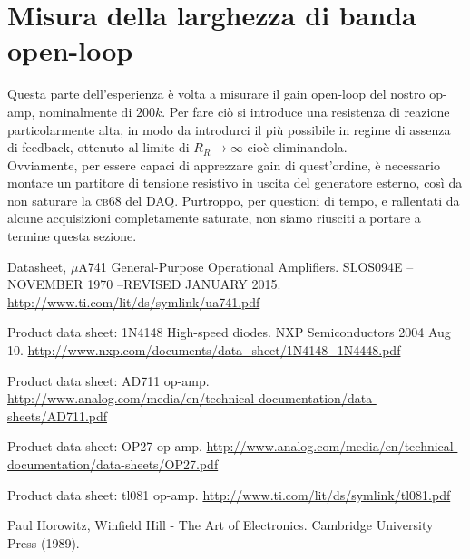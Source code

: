 \documentclass[journal, a4paper]{IEEEtran}
\begin{document}
\section{Misura della larghezza di banda open-loop}

Questa parte dell'esperienza è volta a misurare il gain open-loop del nostro op-amp, nominalmente di $200k$. Per fare ciò si introduce una resistenza di reazione particolarmente alta, in modo da introdurci il più possibile in regime di assenza di feedback, ottenuto al limite di $R_R \rightarrow \infty $  cioè eliminandola.\\
Ovviamente, per essere capaci di apprezzare gain di quest'ordine, è necessario montare un partitore di tensione resistivo in uscita del generatore esterno, così da non saturare la \textsc{cb68} del DAQ. Purtroppo, per questioni di tempo, e rallentati da alcune acquisizioni completamente saturate, non siamo riusciti a portare a termine questa sezione.



\begin{thebibliography}{5}

	Datasheet, $\mu $A741 General-Purpose Operational Amplifiers. SLOS094E – NOVEMBER 1970  –REVISED JANUARY 2015.
	\url{http://www.ti.com/lit/ds/symlink/ua741.pdf}

	Product data sheet: 1N4148 High-speed diodes. NXP Semiconductors 2004 Aug 10.
	\url{http://www.nxp.com/documents/data_sheet/1N4148_1N4448.pdf}

	Product data sheet: AD711 op-amp.
	\url{http://www.analog.com/media/en/technical-documentation/data-sheets/AD711.pdf}
	
	Product data sheet: OP27 op-amp.
	\url{http://www.analog.com/media/en/technical-documentation/data-sheets/OP27.pdf}
	
	Product data sheet: tl081 op-amp.
	\url{http://www.ti.com/lit/ds/symlink/tl081.pdf}

	Paul Horowitz, Winfield Hill - The Art of Electronics. Cambridge University Press (1989).
	
\end{thebibliography}

\end{document}
